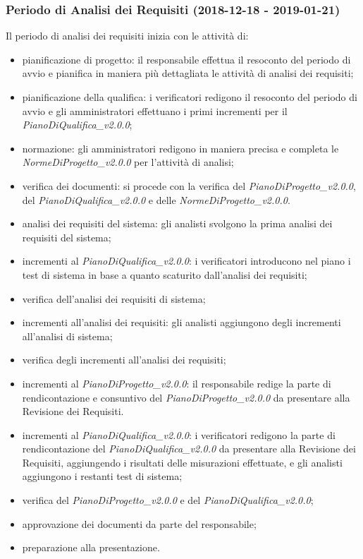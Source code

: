 	\subsubsection{Periodo di Analisi dei Requisiti (2018-12-18 - 2019-01-21)}	
 Il periodo di analisi dei requisiti inizia con le attività di:
			\begin{itemize}
				\item pianificazione di progetto: il responsabile effettua il resoconto del periodo di avvio e pianifica in maniera più dettagliata le attività di analisi dei requisiti; 
				\item pianificazione della qualifica: i verificatori redigono il resoconto del periodo di avvio e gli amministratori effettuano i primi incrementi per il \textit{PianoDiQualifica\_v2.0.0};
				\item normazione: gli amministratori redigono in maniera precisa e completa le \textit{NormeDiProgetto\_v2.0.0} per l'attività di analisi;
				\item verifica dei documenti: si procede con la verifica del \textit{PianoDiProgetto\_v2.0.0}, del \textit{PianoDiQualifica\_v2.0.0} e delle \textit{NormeDiProgetto\_v2.0.0}.
				\item analisi dei requisiti del sistema: gli analisti svolgono la prima analisi dei requisiti del sistema;
				\item incrementi al \textit{PianoDiQualifica\_v2.0.0}: i verificatori introducono nel piano i test di sistema in base a quanto scaturito dall'analisi dei requisiti;
				\item verifica dell'analisi dei requisiti di sistema;
				\item incrementi all'analisi dei requisiti: gli analisti aggiungono degli incrementi all'analisi di sistema;
				\item verifica degli incrementi all'analisi dei requisiti;
				\item incrementi al \textit{PianoDiProgetto\_v2.0.0}: il responsabile redige la parte di rendicontazione e consuntivo del \textit{PianoDiProgetto\_v2.0.0} da presentare alla Revisione dei Requisiti.
				\item incrementi al \textit{PianoDiQualifica\_v2.0.0}: i verificatori redigono la parte di rendicontazione del \textit{PianoDiQualifica\_v2.0.0} da presentare alla Revisione dei Requisiti, aggiungendo i risultati delle misurazioni effettuate, e gli analisti aggiungono i restanti test di sistema;
				\item verifica del \textit{PianoDiProgetto\_v2.0.0} e del \textit{PianoDiQualifica\_v2.0.0};
				\item approvazione dei documenti da parte del responsabile;
				\item preparazione alla presentazione.			
			\end{itemize}
			
